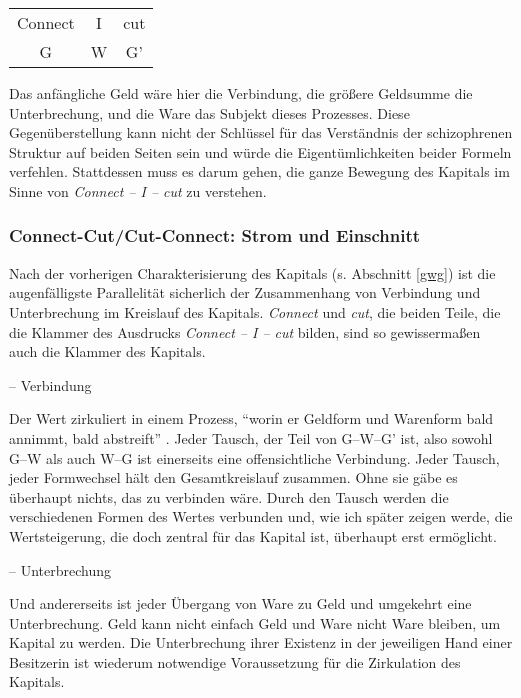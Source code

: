 \documentclass[12pt,
               DIV13,
               paper=a4,
               twoside=false,
               onehalfspacing,
               bibliography=totoc,
               toc=graduated,
               draft,
               ]{scrartcl}
\newcommand{\pc}[2]{\parencite[#1]{#2}}
\newcommand{\worries}[1]{\ifdraft{\textcolor{blue}{\texttt{(#1)}}}{}}
\newcommand{\gwg}{G--W--G'\xspace}
\newcommand{\cic}{Connect -- I -- cut\xspace}
\begin{document}
{\centering\hfill
\begin{tabular}{c@{ -- }c@{ -- }c}
Connect & I & cut\\
G & W & G'
\end{tabular}
\hfill}

Das anfängliche Geld wäre hier die Verbindung, die größere Geldsumme
die Unterbrechung, und die Ware das Subjekt dieses Prozesses. Diese
Gegenüberstellung kann nicht der Schlüssel für das Verständnis der
schizophrenen Struktur auf beiden Seiten sein und würde die
Eigentümlichkeiten beider Formeln verfehlen. Stattdessen muss es darum
gehen, die ganze Bewegung des Kapitals im Sinne von \emph{\cic} zu
verstehen.

\worries{Genauer!}



\subsubsection{Connect-Cut/Cut-Connect: Strom und Einschnitt}


Nach der vorherigen Charakterisierung des Kapitals (s. Abschnitt \ref{gwg}) ist
die augenfälligste Parallelität sicherlich der Zusammenhang von
Verbindung und Unterbrechung im Kreislauf des Kapitals. \emph{Connect}
und \emph{cut}, die beiden Teile, die die Klammer des Ausdrucks \emph{\cic}
bilden, sind so gewissermaßen auch die Klammer des Kapitals.

-- Verbindung

Der Wert zirkuliert in einem Prozess, "`worin er Geldform und
Warenform bald annimmt, bald abstreift"' \pc{169}{kap}. Jeder Tausch,
der Teil von \gwg ist, also sowohl G--W als auch W--G ist einerseits
eine offensichtliche Verbindung. Jeder Tausch, jeder Formwechsel hält
den Gesamtkreislauf zusammen. Ohne sie gäbe es überhaupt nichts, das
zu verbinden wäre. Durch den Tausch werden die verschiedenen Formen
des Wertes verbunden und, wie ich später zeigen werde, die
Wertsteigerung, die doch zentral für das Kapital ist, überhaupt erst
ermöglicht.

-- Unterbrechung

Und andererseits ist jeder Übergang von Ware zu Geld und umgekehrt
eine Unterbrechung. Geld kann nicht einfach Geld und Ware nicht Ware
bleiben, um Kapital zu werden. Die Unterbrechung ihrer Existenz in der
jeweiligen Hand einer Besitzerin ist wiederum notwendige
Voraussetzung für die Zirkulation des Kapitals.
\end{document}
